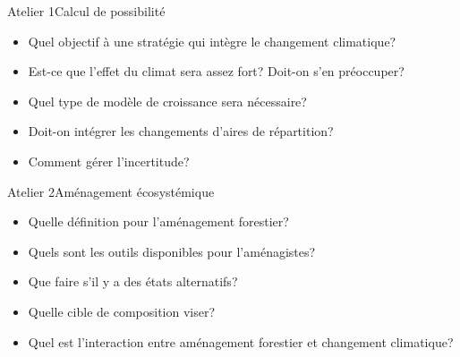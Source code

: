 \documentclass{eecslides}
\begin{document}
	
	\begin{frame}{Atelier 1}{Calcul de possibilité}

		\begin{itemize}
			\item Quel objectif à une stratégie qui intègre le changement climatique?
			\item Est-ce que l'effet du climat sera assez fort? Doit-on s'en préoccuper?
			\item Quel type de modèle de croissance sera nécessaire?
			\item Doit-on intégrer les changements d'aires de répartition?
			\item Comment gérer l'incertitude?
		\end{itemize}

	\end{frame}

	
	\begin{frame}{Atelier 2}{Aménagement écosystémique}

		\begin{itemize}
			\item Quelle définition pour l'aménagement forestier?
			\item Quels sont les outils disponibles pour l'aménagistes?
			\item Que faire s'il y a des états alternatifs?
			\item Quelle cible de composition viser?
			\item Quel est l'interaction entre aménagement forestier et changement climatique?
		\end{itemize}

	\end{frame}

\end{document}
